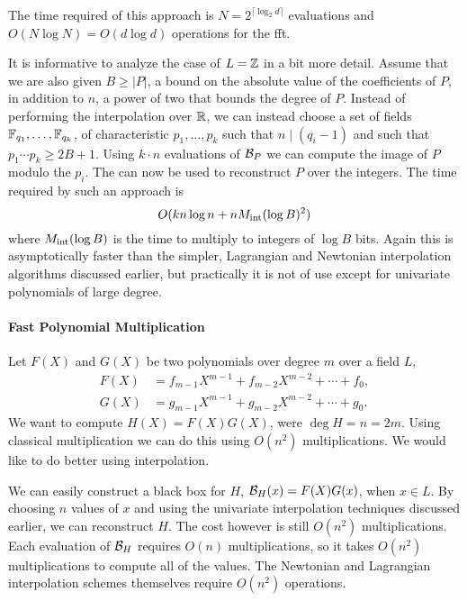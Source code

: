 The time required of this approach is $N = 2^{\lceil \log_2 d
\rceil}$ evaluations and $O(N \log N) = O(d \log d)$ operations for 
the {\sc fft}.

\medskip
It is informative to analyze the case of $L = \mathbb{Z}$ in a bit more
detail.  Assume that we are also given $B \ge |P|$, a bound on the
absolute value of the coefficients of $P$, in addition to $n$, a power
of two that bounds the degree of $P$.  Instead of performing the
interpolation over $\mathbb{R}$, we can instead choose a set of fields
$\mathbb{F}_{q_1}, \ldots, \mathbb{F}_{q_k}$, of characteristic $p_1, \ldots, p_k$
such that $n \mid (q_i -1)$ and such that $p_1 \cdots p_k \ge 2B + 1$.
Using $k \cdot n$ evaluations of ${\cal B}_P$ we can compute the image
of $P$ modulo the $p_i$.  The  can now be
used to reconstruct $P$ over the integers.  The time required by such
an approach is
\[
O(k n \log n + n M_{\rm int}(\log B)^2)
\]
where $M_{\rm int}(\log B)$ is the time to multiply to integers of
$\log B$ bits.  Again this is asymptotically faster than the simpler,
Lagrangian and Newtonian interpolation algorithms discussed earlier,
but practically it is not of use except for univariate polynomials of
large degree.

\paragraph{Fast Polynomial Multiplication}

Let $F(X)$ and $G(X)$ be two polynomials over degree $m$ over a field
$L$,
\[
\begin{aligned}
  F(X) &= f_{m-1} X^{m-1} + f_{m-2} X^{m-2} + \cdots + f_0,\\
  G(X) &= g_{m-1} X^{m-1} + g_{m-2} X^{m-2} + \cdots + g_0.
\end{aligned}
\]
We want to compute $H(X) = F(X) G(X)$, were $\deg H = n = 2m$.  Using
classical multiplication we can do this using $O(n^2)$
multiplications.  We would like to do better using interpolation. 

We can easily construct a black box for $H$, ${\cal B}_H(x) = F(X)
G(x)$, when $x \in L$.  By choosing $n$ values of $x$ and using the
univariate interpolation techniques discussed earlier, we can
reconstruct $H$.  The cost however is still $O(n^2)$ multiplications.
Each evaluation of ${\cal B}_H$ requires $O(n)$ multiplications, so it
takes $O(n^2)$ multiplications to compute all of the values.  The
Newtonian and Lagrangian interpolation schemes themselves require
$O(n^2)$ operations.

